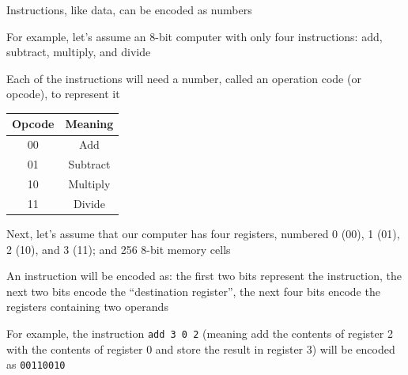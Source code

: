 \documentclass[8pt,a4paper,compress]{beamer}
\begin{document}
\begin{frame}[fragile]
\pause

Instructions, like data, can be encoded as numbers

\pause
\bigskip

For example, let's assume an 8-bit computer with only four instructions: add, subtract, multiply, and divide

\pause
\bigskip

Each of the instructions will need a number, called an operation code (or opcode), to represent it
\begin{center}
\begin{tabular}{cc}
Opcode & Meaning \\ \hline
00 & Add \\
01 & Subtract \\ 
10 & Multiply \\
11 & Divide
\end{tabular}
\end{center}

\pause
\bigskip

Next, let's assume that our computer has four registers, numbered 0 (00), 1 (01), 2 (10), and 3 (11); and 256 8-bit memory cells

\pause
\bigskip

An instruction will be encoded as: the first two bits represent the instruction, the next two bits encode the ``destination register'', the next four bits encode the registers containing two operands

\pause
\bigskip

For example, the instruction \lstinline{add 3 0 2} (meaning add the contents of register 2 with the contents of register 0 and store the result in register 3) will be encoded as \lstinline{00110010}
\end{frame}
\end{document}
